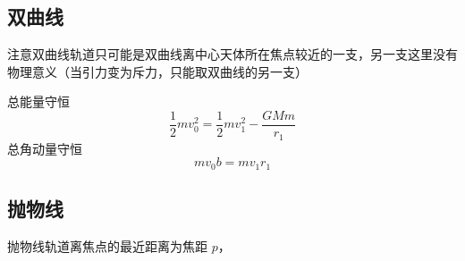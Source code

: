 \subsection{双曲线}
注意双曲线轨道只可能是双曲线离中心天体所在焦点较近的一支，另一支这里没有物理意义（当引力变为斥力，只能取双曲线的另一支）

总能量守恒
\begin{equation}
\frac12 mv_0^2 = \frac12 mv_1^2 - \frac{GMm}{r_1}
\end{equation}
总角动量守恒
\begin{equation}
m v_0 b = m v_1 r_1
\end{equation}

\subsection{抛物线}
抛物线轨道离焦点的最近距离为焦距 $p$，

